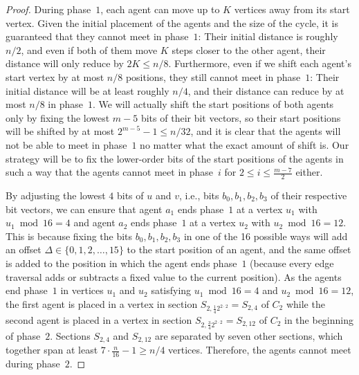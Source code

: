 {\begin{proof}
    During phase~$1$, each agent can move up to $K$ vertices away from its start
    vertex. Given the initial placement of the agents and the size of the cycle,
    it is guaranteed that they cannot meet in phase~$1$: {Their initial
    distance is roughly $n/2$, and even if both of them move $K$ steps closer to
    the other agent, their distance will only reduce by $2K\le n/8$.
    Furthermore, even if we shift each agent's start vertex by at most $n/8$
    positions, they still cannot meet in phase~$1$: Their initial distance will
    be at least roughly $n/4$, and their distance can reduce by at most $n/8$ in
    phase~$1$.  We will actually shift the start positions of both agents only by
    fixing the lowest $m-5$ bits of their bit vectors, so their start positions
    will be shifted by at most $2^{m-5}-1\le n/32$, and it is clear that the
    agents will not be able to meet in phase~$1$ no matter what the exact amount
    of shift is. Our strategy will be to fix the lower-order bits of the start
    positions of the agents in such a way that the agents cannot meet in
    phase~$i$ for $2\le i\le \frac{m-7}{2}$ either.}

    By adjusting the lowest $4$ bits of $u$ and $v$, i.e., bits $b_0, b_1, b_2,
    b_3$ of their respective bit vectors, we can ensure that agent $a_1$ ends
    phase~$1$ at a vertex $u_1$ with $u_{1} \bmod {16} = 4$ and agent $a_2$ ends
    phase~$1$ at a vertex $u_2$ with $u_{2} \bmod {16} = 12$. This is because
    fixing the bits $b_0, b_1, b_2, b_3$ in one of the 16 possible ways will add
    an offset $\Delta\in\{0,1,2,\ldots,15\}$ to the start position of an agent,
    and the same offset is added to the position in which the agent ends
    phase~$1$ (because every edge traversal adds or subtracts a fixed value to
    the current position). As the agents end phase~$1$ in vertices $u_1$ and
    $u_2$ satisfying $u_{1} \bmod {16} = 4$ and $u_{2} \bmod {16} = 12$, the
    first agent is placed in a vertex in section $S_{2, \frac{1}{4} 2^{2 \cdot
    2}} = S_{2, 4}$ of $C_2$ while the second agent is placed in a vertex in
    section $S_{2,  \frac{3}{4} 2^{2 \cdot 2}} = S_{2, 12}$ of $C_2$ in the
    beginning of phase~$2$. Sections $S_{2,4}$ and $S_{2, 12}$ are separated by
    seven other sections, which together span at least $7\cdot \frac{n}{16} -
    1\ge n/4$ vertices. Therefore, the agents cannot meet during phase~$2$.


\end{proof}}
